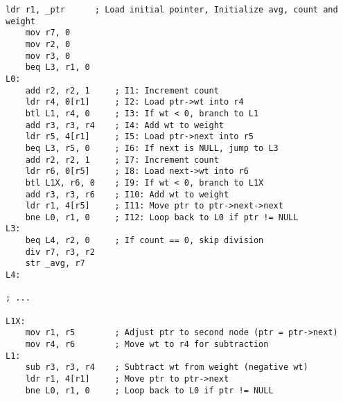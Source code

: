 




\begin{lstlisting}[style=AsmStyle]
    ldr r1, _ptr      ; Load initial pointer, Initialize avg, count and weight
    mov r7, 0         
    mov r2, 0         
    mov r3, 0         
    beq L3, r1, 0     
L0:
    add r2, r2, 1     ; I1: Increment count
    ldr r4, 0[r1]     ; I2: Load ptr->wt into r4
    btl L1, r4, 0     ; I3: If wt < 0, branch to L1
    add r3, r3, r4    ; I4: Add wt to weight
    ldr r5, 4[r1]     ; I5: Load ptr->next into r5
    beq L3, r5, 0     ; I6: If next is NULL, jump to L3
    add r2, r2, 1     ; I7: Increment count
    ldr r6, 0[r5]     ; I8: Load next->wt into r6
    btl L1X, r6, 0    ; I9: If wt < 0, branch to L1X
    add r3, r3, r6    ; I10: Add wt to weight
    ldr r1, 4[r5]     ; I11: Move ptr to ptr->next->next
    bne L0, r1, 0     ; I12: Loop back to L0 if ptr != NULL
L3:
    beq L4, r2, 0     ; If count == 0, skip division
    div r7, r3, r2    
    str _avg, r7      
L4:

; ...

L1X:
    mov r1, r5        ; Adjust ptr to second node (ptr = ptr->next)
    mov r4, r6        ; Move wt to r4 for subtraction
L1: 
    sub r3, r3, r4    ; Subtract wt from weight (negative wt)
    ldr r1, 4[r1]     ; Move ptr to ptr->next
    bne L0, r1, 0     ; Loop back to L0 if ptr != NULL
\end{lstlisting}

